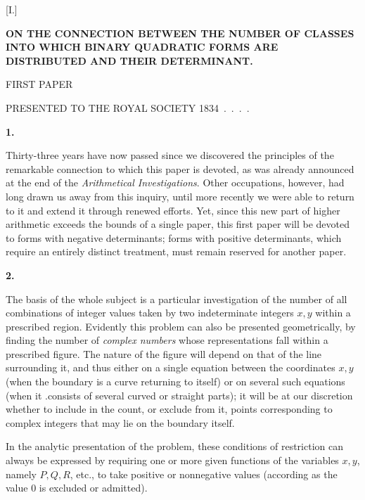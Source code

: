 \clearpage
{}
\renewcommand{\BookRunningTitle}{The Number of Classes and Their Determinant}
\renewcommand{\Article}[1]{\par\medskip\Needspace{4\baselineskip}\pdfbookmark[1]{Art. #1}{nexus-prior-art-#1}\centerline{\textbf{#1.}}\nobreak\smallskip}
\begin{center}
[I.]\par\medskip
\Large\bfseries ON THE CONNECTION BETWEEN THE NUMBER OF CLASSES INTO WHICH BINARY QUADRATIC FORMS ARE DISTRIBUTED AND THEIR DETERMINANT.\par\medskip
\normalsize FIRST PAPER\par\medskip
PRESENTED TO THE ROYAL SOCIETY 1834\ .\ .\ .\ .
\end{center}

\Article{1}
Thirty-three years have now passed since we discovered the principles of the remarkable connection to which this paper is devoted, as was already announced at the end of the \emph{Arithmetical Investigations}. Other occupations, however, had long drawn us away from this inquiry, until more recently we were able to return to it and extend it through renewed efforts. Yet, since this new part of higher arithmetic exceeds the bounds of a single paper, this first paper will be devoted to forms with negative determinants; forms with positive determinants, which require an entirely distinct treatment, must remain reserved for another paper.

\Article{2}
The basis of the whole subject is a particular investigation of the number of all combinations of integer values taken by two indeterminate integers $x,y$ within a prescribed region. Evidently this problem can also be presented geometrically, by finding the number of \emph{complex numbers} whose representations fall within a prescribed figure. The nature of the figure will depend on that of the line surrounding it, and thus either on a single equation between the coordinates $x,y$ (when the boundary is a curve returning to itself) or on several such
equations (when it .consists of several curved or straight parts); it will be at our discretion whether to include in the count, or exclude from it, points corresponding to complex integers that may lie on the boundary itself.

In the analytic presentation of the problem, these conditions of restriction can always be expressed by requiring one or more given functions of the variables $x,y$, namely $P,Q,R$, etc., to take positive or nonnegative values (according as the value $0$ is excluded or admitted).

